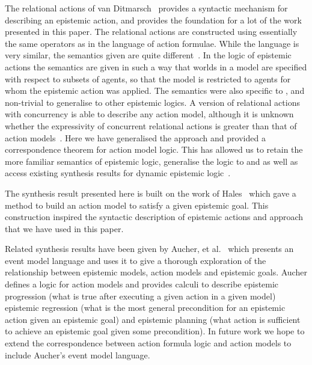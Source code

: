 \documentclass[twoside]{aiml14}
\begin{document}
  The relational actions of van Ditmarsch~\cite{vanditmarsch2001} provides a
  syntactic mechanism for describing an epistemic action, and provides the
  foundation for a lot of the work presented in this paper. The relational
  actions are constructed using essentially the same operators as in the
  language of action formulae. While the language is very similar, the
  semantics given are quite different~\cite{vanditmarsch2007}. In the logic of
  epistemic actions the semantics are given in such a way that worlds in a
  model are specified with respect to subsets of agents, so that the model is
  restricted to agents for whom the epistemic action was applied. The semantics
  were also specific to \classS{}, and non-trivial to generalise to other
  epistemic logics. A version of relational actions with concurrency is able to
  describe any \classS{} action model, although it is unknown whether the
  expressivity of concurrent relational actions is greater than that of action
  models~\cite{baltag2006}. Here we have generalised the approach and
  provided a correspondence theorem for action model logic. This has allowed us
  to retain the more familiar semantics of epistemic logic, generalise the
  logic to \classK{} and \classKFF{} as well as access existing
  synthesis results for dynamic epistemic logic~\cite{hales2013}.
  
  The synthesis result presented here is built on the work of
  Hales~\cite{hales2013} which gave a method to build an action model to
  satisfy a given epistemic goal. This construction inspired the syntactic
  description of epistemic actions and approach that we have used in this
  paper.
  
  Related synthesis results have been given by Aucher, et
  al.~\cite{aucher2011,aucher2012,aucher2013} which presents an event model
  language and uses it to give a thorough exploration of the relationship
  between epistemic models, action models and epistemic goals. Aucher defines a
  logic for action models and provides calculi to describe epistemic
  progression (what is true after executing a given action in a given model)
  epistemic regression (what is the most general precondition for an epistemic
  action given an epistemic goal) and epistemic planning (what action is
  sufficient to achieve an epistemic goal given some precondition). In future
  work we hope to extend the correspondence between action formula logic and
  action models to include Aucher's event model language.



\end{document}
